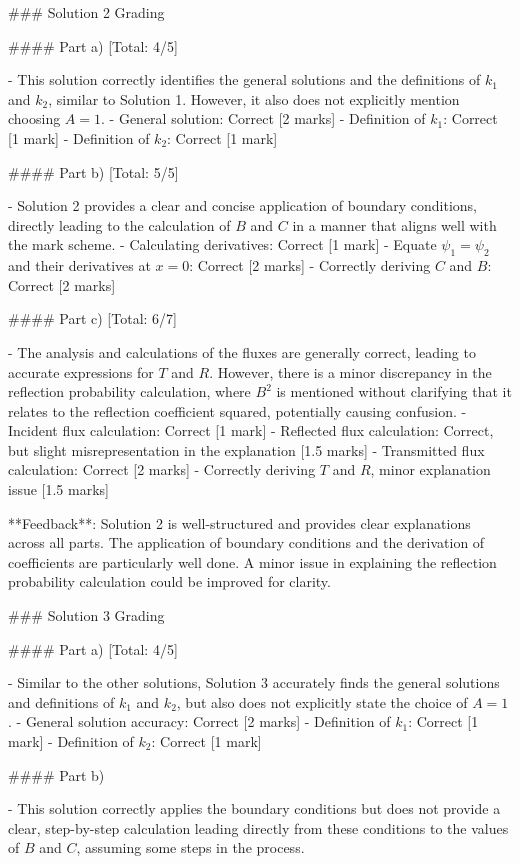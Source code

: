 \documentclass[a4paper,11pt]{article}
\begin{document}
### Solution 2 Grading

#### Part a) [Total: 4/5]

- This solution correctly identifies the general solutions and the definitions of \(k_1\) and \(k_2\), similar to Solution 1. However, it also does not explicitly mention choosing \(A = 1\).
  - General solution: Correct [2 marks]
  - Definition of \(k_1\): Correct [1 mark]
  - Definition of \(k_2\): Correct [1 mark]

#### Part b) [Total: 5/5]

- Solution 2 provides a clear and concise application of boundary conditions, directly leading to the calculation of \(B\) and \(C\) in a manner that aligns well with the mark scheme.
  - Calculating derivatives: Correct [1 mark]
  - Equate \(\psi_1 = \psi_2\) and their derivatives at \(x = 0\): Correct [2 marks]
  - Correctly deriving \(C\) and \(B\): Correct [2 marks]

#### Part c) [Total: 6/7]

- The analysis and calculations of the fluxes are generally correct, leading to accurate expressions for \(T\) and \(R\). However, there is a minor discrepancy in the reflection probability calculation, where \(B^2\) is mentioned without clarifying that it relates to the reflection coefficient squared, potentially causing confusion.
  - Incident flux calculation: Correct [1 mark]
  - Reflected flux calculation: Correct, but slight misrepresentation in the explanation [1.5 marks]
  - Transmitted flux calculation: Correct [2 marks]
  - Correctly deriving \(T\) and \(R\), minor explanation issue [1.5 marks]

**Feedback**: Solution 2 is well-structured and provides clear explanations across all parts. The application of boundary conditions and the derivation of coefficients are particularly well done. A minor issue in explaining the reflection probability calculation could be improved for clarity.

### Solution 3 Grading

#### Part a) [Total: 4/5]

- Similar to the other solutions, Solution 3 accurately finds the general solutions and definitions of \(k_1\) and \(k_2\), but also does not explicitly state the choice of \(A = 1\).
  - General solution accuracy: Correct [2 marks]
  - Definition of \(k_1\): Correct [1 mark]
  - Definition of \(k_2\): Correct [1 mark]

#### Part b)

- This solution correctly applies the boundary conditions but does not provide a clear, step-by-step calculation leading directly from these conditions to the values of \(B\) and \(C\), assuming some steps in the process.
\end{document}
